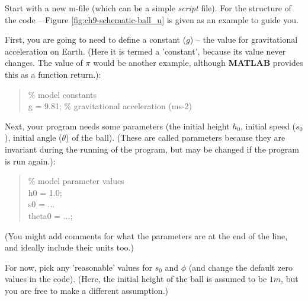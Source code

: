 \documentclass{tufte-book} %
\newenvironment{docspec}{\begin{quotation}\ttfamily\parskip0pt\parindent0pt\ignorespaces}{\end{quotation}}
\begin{document}
 Start with a new \textsf{m-file} (which can be a simple \textit{script} file). For the structure of the code -- Figure \ref{fig:ch9-schematic-ball_u} is given as an example to guide you. 

First, you are going to need to define a constant (\(g\)) -- the value for gravitational acceleration on Earth. (Here it is termed a 'constant', because its value never changes. The value of \(\pi\) would be another example, although \textbf{MATLAB} provides this as a function return.):
\begin{docspec}
\textcolor[rgb]{0,0.501961,0}{\% model constants}\\
g = 9.81; \textcolor[rgb]{0,0.501961,0}{\% gravitational acceleration (ms-2)}
\end{docspec}

Next, your program needs some parameters (the initial height \(h_{0}\), initial speed (\(s_{0}\)), initial angle (\(\theta\)) of the ball). (These are called parameters because they are invariant during the running of the program, but may be changed if the program is run again.):
\begin{docspec}
\textcolor[rgb]{0,0.501961,0}{\% model parameter values}\\
h0 = 1.0;\\
s0 = ...\\
theta0 = ...;
\end{docspec}
(You might add comments for what the parameters are at the end of the line, and ideally include their units too.)

For now, pick any 'reasonable' values for \(s_{0}\)  and \(\phi\)  (and change the default zero values in the code). (Here, the initial height of the ball is assumed to be \(1m\), but you are free to make a different assumption.)
\end{document}
